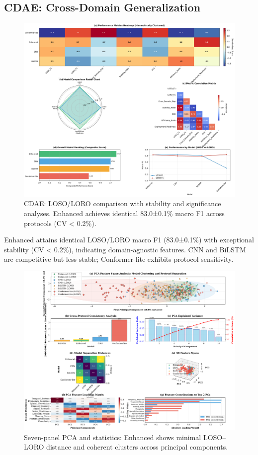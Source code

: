 \documentclass[journal]{IEEEtran}
\begin{document}
\subsection{CDAE: Cross-Domain Generalization}
\begin{figure}[t]
\centering
\includegraphics[width=\columnwidth]{figures/fig5_cross_domain.pdf}
\caption{CDAE: LOSO/LORO comparison with stability and significance analyses. Enhanced achieves identical 83.0±0.1\% macro F1 across protocols (CV < 0.2\%).}
\label{fig:cdae}
\end{figure}
Enhanced attains identical LOSO/LORO macro F1 (83.0±0.1\%) with exceptional stability (CV < 0.2\%), indicating domain-agnostic features. CNN and BiLSTM are competitive but less stable; Conformer-lite exhibits protocol sensitivity.

\begin{figure}[t]
\centering
\includegraphics[width=\columnwidth]{figures/fig6_pca_analysis.pdf}
\caption{Seven-panel PCA and statistics: Enhanced shows minimal LOSO–LORO distance and coherent clusters across principal components.}
\label{fig:pca}
\end{figure}
\end{document}
